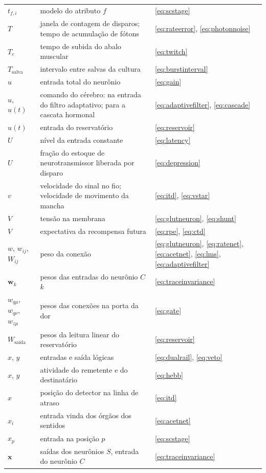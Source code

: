\begin{center}
\begin{longtable}{>{\raggedright}p{2.0cm}>{\raggedright}p{9.6cm}>{\raggedright\arraybackslash}p{2.4cm}}
$t_{f,i}$ & modelo do atributo $f$ & \eqref{eq:scstage} \\
$T$ & janela de contagem de disparos; tempo de acumulação de fótons & \eqref{eq:rateerror}, \eqref{eq:photonnoise} \\
$T_c$ & tempo de subida do abalo muscular & \eqref{eq:twitch} \\
$T_{\text{salva}}$ & intervalo entre salvas da cultura & \eqref{eq:burstinterval} \\
$u$ & entrada total do neurônio & \eqref{eq:gain} \\
$u$, $u(t)$ & comando do cérebro: na entrada do filtro adaptativo; para a cascata hormonal & \eqref{eq:adaptivefilter}, \eqref{eq:cascade} \\
$u(t)$ & entrada do reservatório & \eqref{eq:reservoir} \\
$U$ & nível da entrada constante & \eqref{eq:latency} \\
$U$ & fração do estoque de neurotransmissor liberada por disparo & \eqref{eq:depression} \\
$v$ & velocidade do sinal no fio; velocidade de movimento da mancha & \eqref{eq:itd}, \eqref{eq:vstar} \\
$V$ & tensão na membrana & \eqref{eq:glutneuron}, \eqref{eq:shunt} \\
$V$ & expectativa da recompensa futura & \eqref{eq:rpe}, \eqref{eq:ctd} \\
$w$, $w_{ij}$, $W_{ij}$ & peso da conexão & \eqref{eq:glutneuron}, \eqref{eq:ratenet}, \eqref{eq:acetnet}, \eqref{eq:lms}, \eqref{eq:adaptivefilter} \\
$\mathbf w_k$ & pesos das entradas do neurônio $C$ $k$ & \eqref{eq:traceinvariance} \\
$w_{q\mu}$, $w_{q\nu}$, $w_{z\mu}$ & pesos das conexões na porta da dor & \eqref{eq:gate} \\
$W_{\text{saída}}$ & pesos da leitura linear do reservatório & \eqref{eq:reservoir} \\
$x$, $y$ & entradas e saída lógicas & \eqref{eq:dualrail}, \eqref{eq:veto} \\
$x$, $y$ & atividade do remetente e do destinatário & \eqref{eq:hebb} \\
$x$ & posição do detector na linha de atraso & \eqref{eq:itd} \\
$x_i$ & entrada vinda dos órgãos dos sentidos & \eqref{eq:acetnet} \\
$x_p$ & entrada na posição $p$ & \eqref{eq:scstage} \\
$\mathbf x$ & saídas dos neurônios $S$, entrada do neurônio $C$ & \eqref{eq:traceinvariance} \\

\end{longtable}
\end{center}
